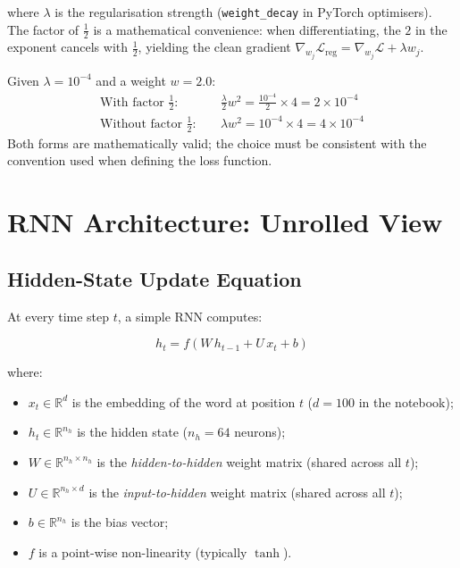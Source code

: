 \documentclass[12pt,a4paper]{article}
\begin{document}
where $\lambda$ is the regularisation strength (\texttt{weight\_decay}
in PyTorch optimisers).  The factor of $\tfrac{1}{2}$ is a
mathematical convenience: when differentiating, the $2$ in the
exponent cancels with $\tfrac{1}{2}$, yielding the clean gradient
$\nabla_{w_j}\mathcal{L}_{\text{reg}} = \nabla_{w_j}\mathcal{L} +
\lambda w_j$.

\begin{example}[title=L2 Penalty Calculation]
  Given $\lambda = 10^{-4}$ and a weight $w = 2.0$:
  \begin{align}
    \text{With factor } \tfrac{1}{2}:&\quad
      \frac{\lambda}{2} w^2 = \frac{10^{-4}}{2} \times 4 = 2 \times 10^{-4} \\
    \text{Without factor } \tfrac{1}{2}:&\quad
      \lambda w^2 = 10^{-4} \times 4 = 4 \times 10^{-4}
  \end{align}
  Both forms are mathematically valid; the choice must be consistent
  with the convention used when defining the loss function.
\end{example}

\section{RNN Architecture: Unrolled View}
\label{sec:rnn_architecture}

\subsection{Hidden-State Update Equation}
\label{subsec:hidden_state}

At every time step $t$, a simple RNN computes:

\begin{equation}
  \boxed{h_t = f\!\left(W\,h_{t-1} + U\,x_t + b\right)}
  \label{eq:rnn_update}
\end{equation}

where:
\begin{itemize}[noitemsep]
  \item $x_t \in \mathbb{R}^{d}$ is the embedding of the word at
        position $t$ ($d = 100$ in the notebook);
  \item $h_t \in \mathbb{R}^{n_h}$ is the hidden state ($n_h = 64$
        neurons);
  \item $W \in \mathbb{R}^{n_h \times n_h}$ is the
        \emph{hidden-to-hidden} weight matrix (shared across all $t$);
  \item $U \in \mathbb{R}^{n_h \times d}$ is the
        \emph{input-to-hidden} weight matrix (shared across all $t$);
  \item $b \in \mathbb{R}^{n_h}$ is the bias vector;
  \item $f$ is a point-wise non-linearity (typically $\tanh$).
\end{itemize}
\end{document}
